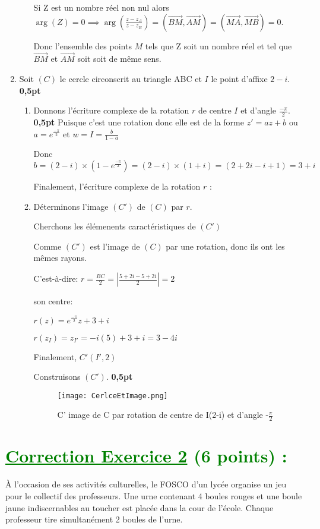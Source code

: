 \documentclass[12pt]{article}
\begin{document}
\begin{enumerate}
\begin{enumerate}
		Si Z est un nombre réel non nul alors \\$ \arg(Z)=0\implies \arg(\frac{z-z_{A}}{z-z_{B}})=(\overrightarrow{BM},\overrightarrow{AM})=(\overrightarrow{MA},\overrightarrow{MB})=0$.
		
		Donc l’ensemble des points $M$ tels que Z soit un nombre réel et tel que $\overrightarrow{BM}$ et $ \overrightarrow{AM}$ soit soit de même sens.
  \end{enumerate}
   \item Soit $(C)$ le cercle circonscrit au triangle ABC et $I$ le point d’affixe $2 - i$.\textbf{ 0,5pt}
   \begin{enumerate}
     \item Donnons l’écriture complexe de la rotation $r$ de centre $I$ et d’angle $\frac{-\pi}{2}$.\textbf{ 0,5pt}
     Puisque c'est une rotation donc elle est de la forme $z'=az+b$ ou $a=e^{\frac{-\pi}{2}}$ et $w=I=\frac{b}{1-a}$
     
     Donc $b=(2 - i)\times (1-e^{\frac{-\pi}{2}})=(2 - i)\times (1+i)=(2 +2i-i+1)=3+i$
     
     Finalement, l’écriture complexe de la rotation $r$ :
     \textcolor{green}{}
     \item Déterminons l’image $(C')$ de $(C)$ par $r$.
     
     Cherchons les élémenents caractéristiques de $(C')$
     
     Comme $(C')$ est l'image de $(C)$ par une rotation, donc ils ont les mêmes rayons. 
     
     C'est-à-dire: $r=\frac{BC}{2}=|\frac{5+2i-5+2i}{2}|=2$
     
     son centre:
     
     $r(z)=e^{\frac{-\pi}{2}}z+3+i$
     
     $r(z_{I})=z_{I'}=-i(5)+3+i=3-4i$
     
     \textcolor{green}{}
     
     Finalement, $C'(I',2)$
     
     Construisons $(C')$.\textbf{ 0,5pt}
\newpage   
\begin{figure}[h]
\centering
\texttt{[image: CerlceEtImage.png]}
\caption{C' image de C par rotation de centre de I(2-i) et d'angle -$\frac{\pi}{2}$}
\label{fig:monimage}
\end{figure}
   \end{enumerate}
\end{enumerate}
\section*{\textcolor{green}{\underline{Correction Exercice 2} (6 points) :}}
À l’occasion de ses activités culturelles, le FOSCO d’un lycée organise un jeu pour le collectif des professeurs. Une urne contenant 4 boules rouges et une boule jaune indiscernables au toucher est placée dans la cour de l’école. Chaque professeur tire simultanément 2 boules de l’urne.
\end{document}
